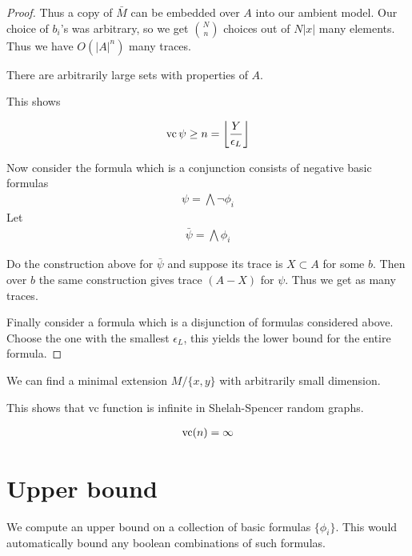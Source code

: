 \documentclass{amsart}
\providecommand{\floor}[1]{\left \lfloor #1 \right \rfloor }
\begin{document}
\begin{proof}
	Thus a copy of $\bar M$ can be embedded over $A$ into our ambient model.
	Our choice of $b_i$'s was arbitrary, so we get ${N \choose n}$ choices out of $N|x|$ many elements.
	Thus we have $O(|A|^n)$ many traces.

	\begin{Lemma}
		There are arbitrarily large sets with properties of $A$.
	\end{Lemma}

	This shows

	\begin{align*}
		\vc \psi \geq n = \floor{\frac{Y}{\epsilon_L}}
	\end{align*}

	Now consider the formula which is a conjunction consists of negative basic formulas
	\begin{align*}
		\psi = \bigwedge \neg \phi_i
	\end{align*}
	Let
	\begin{align*}
		\bar \psi = \bigwedge \phi_i
	\end{align*}

	Do the construction above for $\bar \psi$ and suppose its trace is $X \subset A$ for some $b$.
	Then over $b$ the same construction gives trace $(A - X)$ for $\psi$. Thus we get as many traces.
	
	Finally consider a formula which is a disjunction of formulas considered above.
	Choose the one with the smallest $\epsilon_L$, this yields the lower bound for the entire formula. %
\end{proof}

\begin{Claim}
	We can find a minimal extension $M / \{x, y\}$ with arbitrarily small dimension.
\end{Claim}

This shows that vc function is infinite in Shelah-Spencer random graphs.

\begin{align*}
	\operatorname{vc}(n) = \infty
\end{align*}

\section{Upper bound}

We compute an upper bound on a collection of basic formulas $\{\phi_i\}$. This would automatically bound any boolean combinations of such formulas. %
\end{document}
